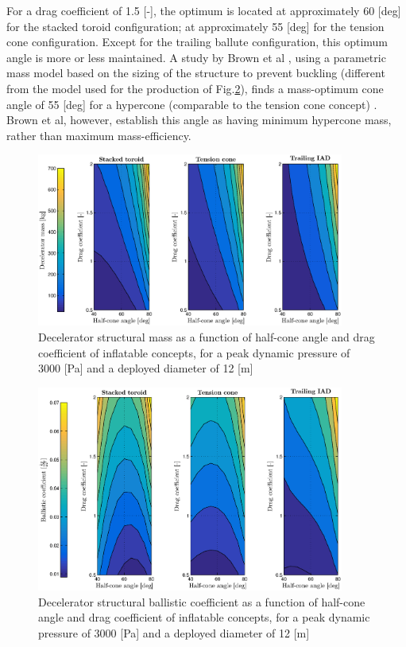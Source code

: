 For a drag coefficient of 1.5 [-], the optimum is located at approximately 60 [deg] for the stacked toroid configuration; at approximately 55 [deg] for the tension cone configuration. Except for the trailing ballute configuration, this optimum angle is more or less maintained. A study by Brown et al \cite{Brown2003}, using a parametric mass model based on the sizing of the structure to prevent buckling (different from the model used for the production of Fig.\ref{fig:bc_theta_cd}), finds a mass-optimum cone angle of 55 [deg] for a hypercone (comparable to the tension cone concept) \cite[p.6]{Brown2003}. Brown et al, however, establish this angle as having minimum hypercone mass, rather than maximum mass-efficiency. 
\begin{figure}[H]
\centering
\includegraphics[width = 0.9\textwidth]{Figure/mass_theta_cd.eps}
\caption{Decelerator structural mass as a function of half-cone angle and drag coefficient of inflatable concepts, for a peak dynamic pressure of 3000 [Pa] and a deployed diameter of 12 [m]}
\label{fig:mass_theta_cd}
\end{figure}

\begin{figure}[H]
\centering
\includegraphics[width = 0.9\textwidth]{Figure/bc_theta_cd.eps}
\caption{Decelerator structural ballistic coefficient as a function of half-cone angle and drag coefficient of inflatable concepts, for a peak dynamic pressure of 3000 [Pa] and a deployed diameter of 12 [m]}
\label{fig:bc_theta_cd}
\end{figure}

